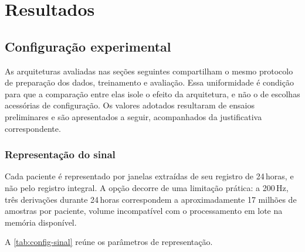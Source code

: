 \chapter{Resultados}
\label{chap:resultados}

%
%
%

\section{Configuração experimental}
\label{sec:configuracao-experimental}

As arquiteturas avaliadas nas seções seguintes compartilham o mesmo
protocolo de preparação dos dados, treinamento e avaliação. Essa
uniformidade é condição para que a comparação entre elas isole o efeito da
arquitetura, e não o de escolhas acessórias de configuração. Os valores
adotados resultaram de ensaios preliminares e são apresentados a seguir,
acompanhados da justificativa correspondente.

\subsection{Representação do sinal}
\label{subsec:config-sinal}

Cada paciente é representado por janelas extraídas de seu registro de
24\,horas, e não pelo registro integral. A opção decorre de uma limitação
prática: a 200\,Hz, três derivações durante 24\,horas correspondem a
aproximadamente 17 milhões de amostras por paciente, volume incompatível com
o processamento em lote na memória disponível.

A \autoref{tab:config-sinal} reúne os parâmetros de representação.

